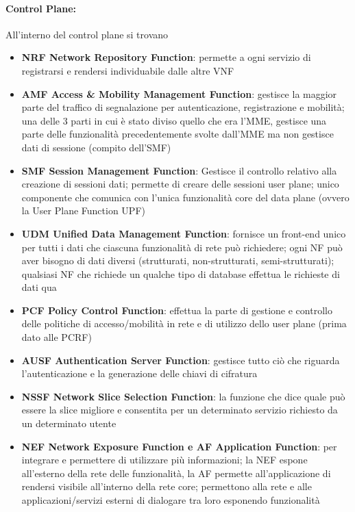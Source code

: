 \paragraph{Control Plane:} All'interno del control plane si trovano
\begin{itemize}
	\item \textbf{NRF Network Repository Function}: permette a ogni servizio di registrarsi e rendersi individuabile dalle altre VNF
	
	\item \textbf{AMF Access \& Mobility Management Function}: gestisce la maggior parte del traffico di segnalazione per autenticazione, registrazione e mobilità; una delle 3 parti in cui è stato diviso quello che era l'MME, gestisce una parte delle funzionalità precedentemente svolte dall'MME ma non gestisce dati di sessione (compito dell'SMF)
	
	\item \textbf{SMF Session Management Function}: Gestisce il controllo relativo alla creazione di sessioni dati; permette di creare delle sessioni user plane; unico componente che comunica con l'unica funzionalità core del data plane (ovvero la User Plane Function UPF)
	
	\item \textbf{UDM Unified Data Management Function}: fornisce un front-end unico per tutti i dati che ciascuna funzionalità di rete può richiedere; ogni NF può aver bisogno di dati diversi (strutturati, non-strutturati, semi-strutturati); qualsiasi NF che richiede un qualche tipo di database effettua le richieste di dati qua
	
	\item \textbf{PCF Policy Control Function}: effettua la parte di gestione e controllo delle politiche di accesso/mobilità in rete e di utilizzo dello user plane (prima dato alle PCRF)
	
	\item \textbf{AUSF Authentication Server Function}: gestisce tutto ciò che riguarda l'autenticazione e la generazione delle chiavi di cifratura
	
	\item \textbf{NSSF Network Slice Selection Function}: la funzione che dice quale può essere la slice migliore e consentita per un determinato servizio richiesto da un determinato utente
	
	\item \textbf{NEF Network Exposure Function e AF Application Function}: per integrare e permettere di utilizzare più informazioni; la NEF espone all'esterno della rete delle funzionalità, la AF permette all'applicazione di rendersi visibile all'interno della rete core; permettono alla rete e alle applicazioni/servizi esterni di dialogare tra loro esponendo funzionalità
\end{itemize}

